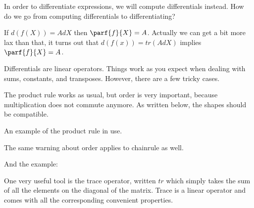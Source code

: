 \documentclass[12pt]{article}
\begin{document}


In order to differentiate expressions, we will compute differentials instead. How do we go from computing differentials to differentiating?

If $d(f(X)) = AdX$ then $\parf{f}{X} = A$. Actually we can get a bit more lax than that, it turns out that $d(f(x)) = tr(AdX)$ implies $\parf{f}{X} = A$. 

Differentials are linear operators. Things work as you expect when dealing with sums, constants, and transposes. However, there are a few tricky cases.

The product rule works as usual, but order is very important, because multiplication does not commute anymore. As written below, the shapes should be compatible. 

An example of the product rule in use.


The same warning about order applies to chainrule as well.

And the example:


One very useful tool is the trace operator, written $tr$ which simply takes the sum of all the elements on the diagonal of the matrix. Trace is a linear operator and comes with all the corresponding convenient properties. 
\end{document}

